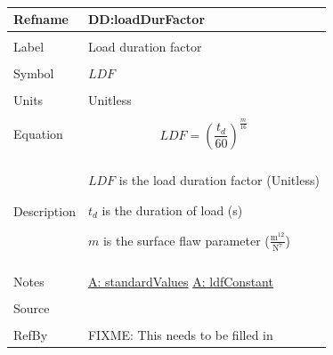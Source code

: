 \documentclass[12pt]{article}
\begin{document}
~\newline
\noindent \begin{minipage}{\textwidth}
\begin{tabular}{p{} p{}}
\toprule \textbf{Refname} & \textbf{DD:loadDurFactor}
\label{DD:loadDurFactor}
\\ \midrule \\
Label & Load duration factor
\\ \midrule \\
Symbol & $LDF$
\\ \midrule \\
Units & Unitless
\\ \midrule \\
Equation & \begin{dmath}
           LDF=\left(\frac{{t_{d}}}{60}\right)^{\frac{m}{16}}
           \end{dmath}
\\ \midrule \\
Description & \begin{symbDescription}
              \item{$LDF$ is the load duration factor (Unitless)}
              \item{${t_{d}}$ is the duration of load (s)}
              \item{$m$ is the surface flaw parameter ($\frac{\text{m}^{12}}{\text{N}^{7}}$)}
              \end{symbDescription}
\\ \midrule \\
Notes & \hyperref[A:standardValues]{A: standardValues}
        \hyperref[A:ldfConstant]{A: ldfConstant}
\\ \midrule \\
Source & \cite{astm2009}
\\ \midrule \\
RefBy & FIXME: This needs to be filled in
\\ \bottomrule \end{tabular}
\end{minipage}\\
~\newline
\end{document}
